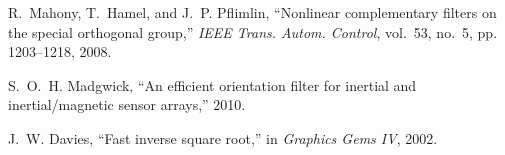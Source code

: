 \documentclass[12pt,letterpaper]{article}
\begin{document}
\begin{thebibliography}{9}
R.~Mahony, T.~Hamel, and J.~P. Pflimlin, “Nonlinear complementary filters on the special orthogonal group,” \emph{IEEE Trans. Autom. Control}, vol.~53, no.~5, pp. 1203–1218, 2008.

S.~O.~H. Madgwick, “An efficient orientation filter for inertial and inertial/magnetic sensor arrays,” 2010.

J.~W. Davies, “Fast inverse square root,” in \emph{Graphics Gems IV}, 2002.

\end{thebibliography}
\end{document}
